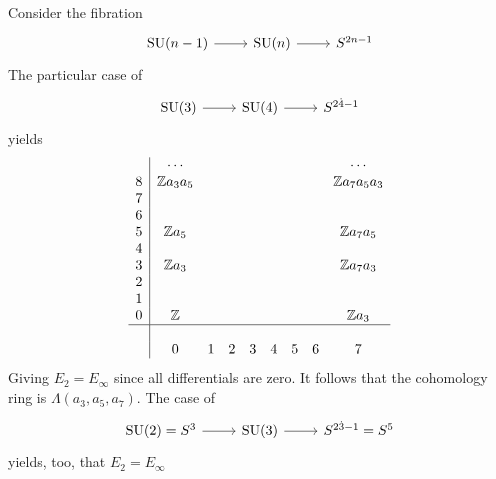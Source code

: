 \documentclass{article}
\newcommand{\Z}{\mathbb{Z}}
\DeclareMathOperator{\SU}{SU}
\begin{document}
\begin{example}  
	Consider the fibration
	\[\begin{tikzcd}
		\SU(n-1)\arrow[r]&\SU(n)\arrow[r]&S^{2n-1}
	\end{tikzcd}\]
	The particular case of 
		\[\begin{tikzcd}
		\SU(3)\arrow[r]&\SU(4)\arrow[r]&S^{2\dot 4-1}
	\end{tikzcd}\]
	yields
	\begin{align*}
		\begin{array}{c|cccccccc}
			&\cdots&&&&&&&\cdots\\
			8&\Z a_3a_5&&&&&&&\Z a_7a_5a_3\\
			7&&&&&&&&\\
			6&&&&&&&&\\
			5&\Z a_5&&&&&&&\Z a_7a_5\\
			4&&&&&&&&\\
			3&\Z a_3&&&&&&&\Z a_7a_3\\
			2&&&&&&&&\\
			1&&&&&&&&\\
			0&\Z&&&&&&&\Z a_3\\
			\hline\\
			&0&1&2&3&4&5&6&7
		\end{array}
	\end{align*}
	Giving $E_2=E_\infty$ since all differentials are zero. It follows that the cohomology ring is $\Lambda(a_3,a_5,a_7)$.
	The case of 
	\[\begin{tikzcd}
		\SU(2)=S^3\arrow[r]&\SU(3)\arrow[r]&S^{2\dot 3-1}=S^5
	\end{tikzcd}\]
	yields, too, that $E_2=E_\infty$ 
\end{example}
\end{document}
